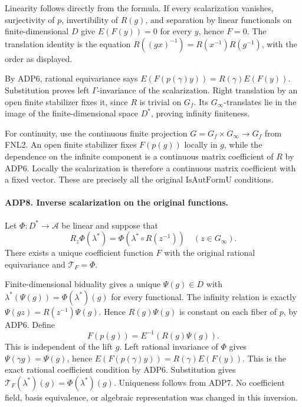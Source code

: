 \documentclass[11pt,a4paper]{article}
\numberwithin{equation}{section}
\theoremstyle{remark}\newtheorem{remark}[theorem]{Remark}
\begin{document}
Linearity follows directly from the formula.  If every scalarization
vanishes, surjectivity of \(p\), invertibility of \(R(g)\), and
separation by linear functionals on finite-dimensional \(D\) give
\(E(F(y))=0\) for every \(y\), hence \(F=0\).  The translation
identity is the equation
\(R((gx)^{-1})=R(x^{-1})R(g^{-1})\), with the order as displayed.

By ADP6, rational equivariance says
\(E(F(p(\gamma)y))=R(\gamma)E(F(y))\).  Substitution proves left
\(\Gamma\)-invariance of the scalarization.  Right translation by
an open finite stabilizer fixes it, since \(R\) is trivial on \(G_f\).
Its \(G_\infty\)-translates lie in the image of the finite-dimensional
space \(D^*\), proving infinity finiteness.

For continuity, use the continuous finite projection
\(G=G_f\times G_\infty\to G_f\) from FNL2.  An open finite
stabilizer fixes \(F(p(g))\) locally in \(g\), while the dependence
on the infinite component is a continuous matrix coefficient of \(R\)
by ADP6.  Locally the scalarization is therefore a continuous matrix
coefficient with a fixed vector.  These are precisely all the original
\(\mathrm{IsAutFormU}\) conditions.

\paragraph{ADP8. Inverse scalarization on the original functions.}
\label{claim:ADP8}
Let \(\Phi:D^*\to\mathcal A\) be linear and suppose that
\[
 R_z\Phi(\lambda^*)
      =\Phi(\lambda^*\circ R(z^{-1}))\quad(z\in G_\infty).
\]
There exists a unique coefficient function \(F\) with the original
rational equivariance and \(\mathcal T_F=\Phi\).

Finite-dimensional biduality gives a unique \(\Psi(g)\in D\) with
\(\lambda^*(\Psi(g))=\Phi(\lambda^*)(g)\) for every functional.
The infinity relation is exactly
\(\Psi(gz)=R(z^{-1})\Psi(g)\).  Hence \(R(g)\Psi(g)\) is constant
on each fiber of \(p\), by ADP6.  Define
\[
                    F(p(g))=E^{-1}(R(g)\Psi(g)).
\]
This is independent of the lift \(g\).  Left rational invariance of
\(\Phi\) gives \(\Psi(\gamma g)=\Psi(g)\), hence
\(E(F(p(\gamma)y))=R(\gamma)E(F(y))\).  This is the exact rational
coefficient condition by ADP6.  Substitution gives
\(\mathcal T_F(\lambda^*)(g)=\Phi(\lambda^*)(g)\).  Uniqueness
follows from ADP7.  No coefficient field, basis equivalence, or
algebraic representation was changed in this inversion.
\end{document}
